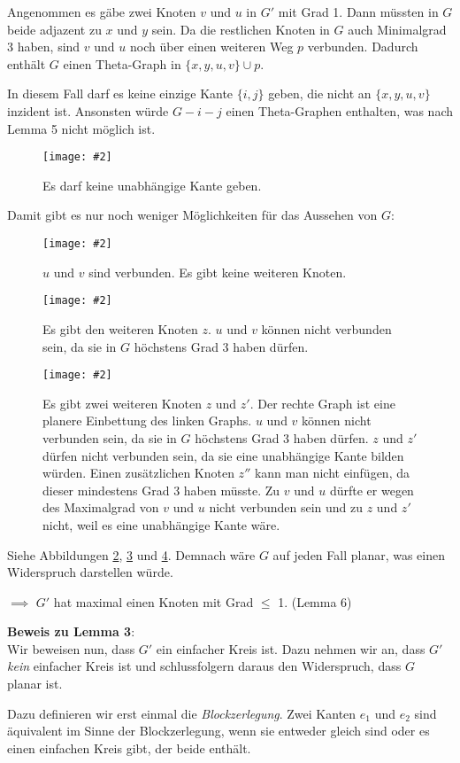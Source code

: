 \documentclass[10pt,a4paper]{article}
\makeatletter
\def\maxwidth#1{\ifdim\Gin@nat@width>#1 #1\else\Gin@nat@width\fi}
\newcommand{\imageFigure}[4]{%
    \begin{figure}[h]%
        \centering%
        {%
            \setlength{\fboxsep}{1pt}%
            \setlength{\fboxrule}{1pt}%
            \texttt{[image: \#2]}%
        }%
        \caption{#1}%
        \label{fig:#4}%
    \end{figure}%
}
\makeatother
\begin{document}
Angenommen es gäbe zwei Knoten $v$ und $u$ in $G'$ mit Grad 1.
Dann müssten in $G$ beide adjazent zu $x$ und $y$ sein.
Da die restlichen Knoten in $G$ auch Minimalgrad 3 haben, sind $v$ und $u$ noch
über einen weiteren Weg $p$ verbunden.
Dadurch enthält $G$ einen Theta-Graph in $\{x,y,u,v\} \cup p$.

In diesem Fall darf es keine einzige Kante $\{i, j\}$ geben, die nicht an $\{x,
y, u, v\}$ inzident ist.
Ansonsten würde $G - i - j$ einen Theta-Graphen enthalten, was nach Lemma 5
nicht möglich ist.

\imageFigure{Es darf keine unabhängige Kante geben.}{xuvy1.png}{.3}{xuvy1}

Damit gibt es nur noch weniger Möglichkeiten für das Aussehen von $G$:

\imageFigure{
    $u$ und $v$ sind verbunden.
    Es gibt keine weiteren Knoten.
}{xuvy2.png}{.3}{xuvy2}

\imageFigure{
    Es gibt den weiteren Knoten $z$.
    $u$ und $v$ können nicht verbunden sein, da sie in $G$ höchstens Grad 3
    haben dürfen.
}{xuvy3.png}{.9}{xuvy3}

\imageFigure{
    Es gibt zwei weiteren Knoten $z$ und $z'$.
    Der rechte Graph ist eine planere Einbettung des linken Graphs.
    $u$ und $v$ können nicht verbunden sein, da sie in $G$ höchstens Grad 3
    haben dürfen.
    $z$ und $z'$ dürfen nicht verbunden sein, da sie eine unabhängige Kante
    bilden würden.
    Einen zusätzlichen Knoten $z''$ kann man nicht einfügen, da dieser
    mindestens Grad 3 haben müsste.
    Zu $v$ und $u$ dürfte er wegen des Maximalgrad von $v$ und $u$ nicht
    verbunden sein und zu $z$ und $z'$ nicht, weil es eine unabhängige Kante
    wäre.
}{xuvy4.png}{.7}{xuvy4}

Siehe Abbildungen \ref{fig:xuvy2}, \ref{fig:xuvy3} und \ref{fig:xuvy4}.
Demnach wäre $G$ auf jeden Fall planar, was einen Widerspruch darstellen würde.

$\implies$ $G'$ hat maximal einen Knoten mit Grad $\leq$ 1. (Lemma 6)

\clearpage
\textbf{Beweis zu Lemma 3}:\\
Wir beweisen nun, dass $G'$ ein einfacher Kreis ist.
Dazu nehmen wir an, dass $G'$ \textit{kein} einfacher Kreis ist und
schlussfolgern daraus den Widerspruch, dass $G$ planar ist.

Dazu definieren wir erst einmal die \textit{Blockzerlegung}.
Zwei Kanten $e_1$ und $e_2$ sind äquivalent im Sinne der Blockzerlegung, wenn
sie entweder gleich sind oder es einen einfachen Kreis gibt, der beide enthält.
\end{document}
